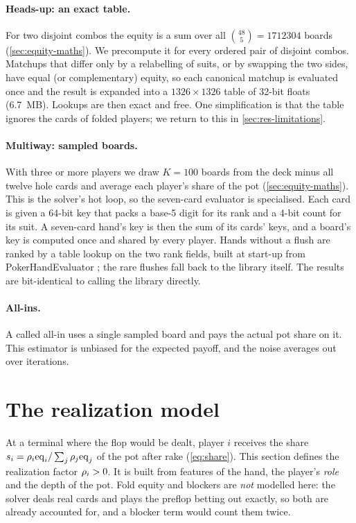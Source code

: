 \paragraph{Heads-up: an exact table.} For two disjoint combos the equity is a sum over all $\binom{48}{5} = \num{1712304}$ boards (\cref{sec:equity-maths}). We precompute it for every ordered pair of disjoint combos. Matchups that differ only by a relabelling of suits, or by swapping the two sides, have equal (or complementary) equity, so each canonical matchup is evaluated once and the result is expanded into a $1326\times 1326$ table of 32-bit floats (\SI{6.7}{MB}). Lookups are then exact and free. One simplification is that the table ignores the cards of folded players; we return to this in \cref{sec:res-limitations}.

\paragraph{Multiway: sampled boards.} With three or more players we draw $K = 100$ boards from the deck minus all twelve hole cards and average each player's share of the pot (\cref{sec:equity-maths}). This is the solver's hot loop, so the seven-card evaluator is specialised. Each card is given a 64-bit key that packs a base-5 digit for its rank and a 4-bit count for its suit. A seven-card hand's key is then the sum of its cards' keys, and a board's key is computed once and shared by every player. Hands without a flush are ranked by a table lookup on the two rank fields, built at start-up from PokerHandEvaluator \cite{phevaluator}; the rare flushes fall back to the library itself. The results are bit-identical to calling the library directly.

\paragraph{All-ins.} A called all-in uses a single sampled board and pays the actual pot share on it. This estimator is unbiased for the expected payoff, and the noise averages out over iterations.

\section{The realization model}\label{sec:realization}

At a terminal where the flop would be dealt, player $i$ receives the share $s_i = \rho_i \mathrm{eq}_i / \sum_{j} \rho_j \mathrm{eq}_j$ of the pot after rake (\cref{eq:share}). This section defines the realization factor $\rho_i > 0$. It is built from features of the hand, the player's \emph{role} and the depth of the pot. Fold equity and blockers are \emph{not} modelled here: the solver deals real cards and plays the preflop betting out exactly, so both are already accounted for, and a blocker term would count them twice.

